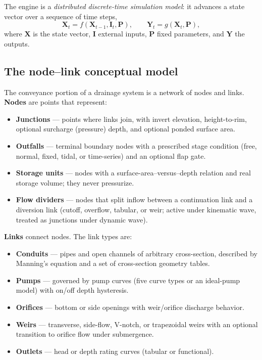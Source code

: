 \documentclass[11pt,a4paper]{article}
\begin{document}
The engine is a \emph{distributed discrete-time simulation model}: it advances
a state vector over a sequence of time steps,
\begin{equation}
  \boldsymbol{X}_{t} = f\!\left(\boldsymbol{X}_{t-1}, \boldsymbol{I}_{t}, \boldsymbol{P}\right),
  \qquad
  \boldsymbol{Y}_{t} = g\!\left(\boldsymbol{X}_{t}, \boldsymbol{P}\right),
\end{equation}
where $\boldsymbol{X}$ is the state vector, $\boldsymbol{I}$ external inputs,
$\boldsymbol{P}$ fixed parameters, and $\boldsymbol{Y}$ the outputs.

\subsection{The node--link conceptual model}

The conveyance portion of a drainage system is a network of nodes and links.
\textbf{Nodes} are points that represent:
\begin{itemize}[nosep]
  \item \textbf{Junctions} --- points where links join, with invert elevation,
        height-to-rim, optional surcharge (pressure) depth, and optional
        ponded surface area.
  \item \textbf{Outfalls} --- terminal boundary nodes with a prescribed stage
        condition (free, normal, fixed, tidal, or time-series) and an optional
        flap gate.
  \item \textbf{Storage units} --- nodes with a surface-area--versus--depth
        relation and real storage volume; they never pressurize.
  \item \textbf{Flow dividers} --- nodes that split inflow between a
        continuation link and a diversion link (cutoff, overflow, tabular, or
        weir; active under kinematic wave, treated as junctions under dynamic
        wave).
\end{itemize}

\textbf{Links} connect nodes. The link types are:
\begin{itemize}[nosep]
  \item \textbf{Conduits} --- pipes and open channels of arbitrary
        cross-section, described by Manning's equation and a set of cross-section
        geometry tables.
  \item \textbf{Pumps} --- governed by pump curves (five curve types or an
        ideal-pump model) with on/off depth hysteresis.
  \item \textbf{Orifices} --- bottom or side openings with weir/orifice
        discharge behavior.
  \item \textbf{Weirs} --- transverse, side-flow, V-notch, or trapezoidal weirs
        with an optional transition to orifice flow under submergence.
  \item \textbf{Outlets} --- head or depth rating curves (tabular or
        functional).
\end{itemize}
\end{document}
